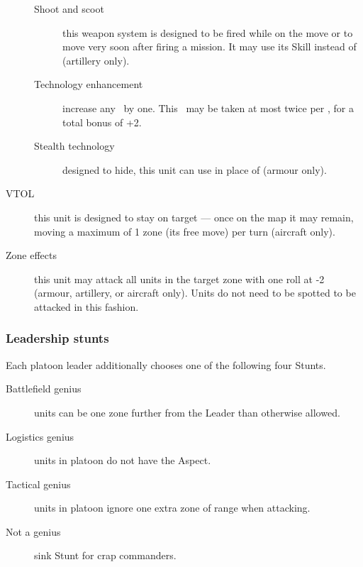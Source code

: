 \begin{description}
\begin{description}
\item[Shoot and scoot]
this weapon system is designed to be fired while on the move or to move very soon after firing a mission. It may use its  Skill instead of  (artillery only).

\item[Technology enhancement]
increase any \Skill\ by one. This \Stunt\ may be taken at most twice per \Skill, for a total bonus of +2.

\item[Stealth technology]
designed to hide, this unit can use  in place of  (armour only).
\end{description}

\item[VTOL]
this unit is designed to stay on target --- once on the map it may remain, moving a maximum of 1 zone (its free move) per turn (aircraft only).

\item[Zone effects]
this unit may attack all units in the target zone with one roll at -2 (armour, artillery, or aircraft only). Units do not need to be spotted to be attacked in this fashion.
\end{description}

\subsubsection{Leadership stunts}

Each platoon leader additionally chooses one of the following four Stunts.

\begin{description}
\item [Battlefield genius]
units can be one zone further from the Leader than otherwise allowed.

\item[Logistics genius]
units in platoon do not have the  Aspect.

\item[Tactical genius]
units in platoon ignore one extra zone of range when attacking.

\item[Not a genius]
sink Stunt for crap commanders.
\end{description}

